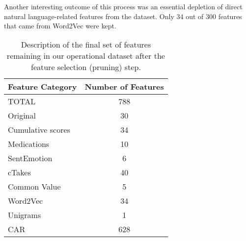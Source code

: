 Another  interesting outcome of 
this process was an essential depletion of direct natural language-related
features from the dataset. Only 34 out of 300 features that came
from \textsf{Word2Vec} were kept.  


\begin{table}[]
    \centering
    \begin{tabular}{|l|c|}
    \hline
    \textsf{Feature Category} & \textsf{Number of Features}  \\
    \hline
    \textsf{TOTAL} & 788 \\
    \hline
    \textsf{Original} & 30\\
    \textsf{Cumulative scores} & 34 \\
    \textsf{Medications} & 10 \\
    \textsf{SentEmotion} & 6 \\
    \textsf{cTakes} & 40 \\
    \textsf{Common Value} & 5\\
    \textsf{Word2Vec} & 34 \\
    \textsf{Unigrams} & 1 \\
    \hline
    \textsf{CAR} & 628 \\
     \hline
    \end{tabular}
    \caption{Description of the final set of features remaining in our
    operational dataset after the feature selection (pruning) step.}
    \label{tab:data3}
\end{table}



